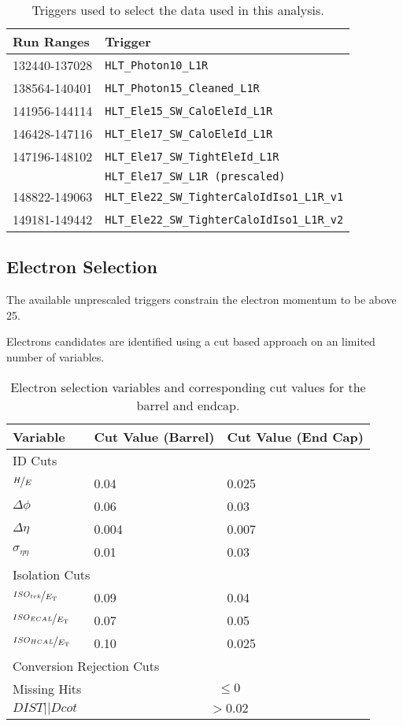 \begin{table}[htb]
  \centering
  \begin{tabular}{ l l }
    Run Ranges & Trigger \\
    \midrule
    132440-137028 & \verb=HLT_Photon10_L1R= \\
    138564-140401 & \verb=HLT_Photon15_Cleaned_L1R= \\
    141956-144114 & \verb=HLT_Ele15_SW_CaloEleId_L1R= \\
    146428-147116 & \verb=HLT_Ele17_SW_CaloEleId_L1R= \\
    147196-148102 & \verb=HLT_Ele17_SW_TightEleId_L1R= \\
                  & \verb=HLT_Ele17_SW_L1R (prescaled)= \\ 
    148822-149063 & \verb=HLT_Ele22_SW_TighterCaloIdIso1_L1R_v1= \\
    149181-149442 & \verb=HLT_Ele22_SW_TighterCaloIdIso1_L1R_v2= \\
  \end{tabular}
  \caption{Triggers used to select the data used in this analysis.}
  \label{asym36:triggers}
\end{table}

\subsection{Electron Selection}

The available unprescaled triggers constrain the electron momentum to be above
\unit{25}{\GeV}.

Electrons candidates are identified using a cut based approach on an limited
number of variables.

\begin{table}[htb]
  \centering
  \begin{tabular}{ l l l}
    Variable & Cut Value (Barrel) & Cut Value (End Cap) \\
    \midrule
    \multicolumn{3}{l}{ID Cuts} \\
    \midrule
    $\nicefrac{H}{E}$ & 0.04 & 0.025  \\
    $\Delta\phi$     & 0.06 & 0.03  \\
    $\Delta\eta$     & 0.004 & 0.007  \\
    $\sigma_{\eta\eta}$ & 0.01 & 0.03  \\
    \midrule
    \multicolumn{3}{l}{Isolation Cuts} \\
    \midrule
    $\nicefrac{ISO_{trk}}{E_{\mathrm{T}}}$    & 0.09 & 0.04  \\
    $\nicefrac{ISO_{ECAL}}{E_{\mathrm{T}}}$     & 0.07 & 0.05  \\
    $\nicefrac{ISO_{HCAL}}{E_{\mathrm{T}}}$     & 0.10 & 0.025  \\
    \midrule
    \multicolumn{3}{l}{Conversion Rejection Cuts} \\
    \midrule
    Missing Hits   & \multicolumn{2}{c}{$\leq 0$} \\
    $DIST || Dcot$ & \multicolumn{2}{c}{$> 0.02$} \\
  \end{tabular}
  \caption{Electron selection variables and corresponding cut values for the
barrel and endcap.}
  \label{asym36:electronselection}
\end{table}

